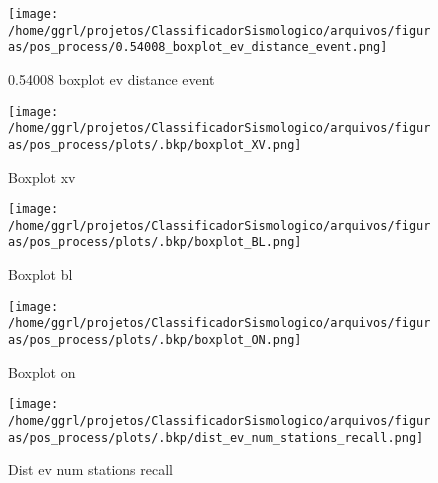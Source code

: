                     \begin{figure}[H]
                        \centering
                        \texttt{[image: /home/ggrl/projetos/ClassificadorSismologico/arquivos/figuras/pos\_process/0.54008\_boxplot\_ev\_distance\_event.png]}
                        \caption{0.54008 boxplot ev distance event}
                        \label{fig:0.54008_boxplot_ev_distance_event}
                    \end{figure}
                

                    \begin{figure}[H]
                        \centering
                        \texttt{[image: /home/ggrl/projetos/ClassificadorSismologico/arquivos/figuras/pos\_process/plots/.bkp/boxplot\_XV.png]}
                        \caption{Boxplot xv}
                        \label{fig:boxplot_XV}
                    \end{figure}
                

                    \begin{figure}[H]
                        \centering
                        \texttt{[image: /home/ggrl/projetos/ClassificadorSismologico/arquivos/figuras/pos\_process/plots/.bkp/boxplot\_BL.png]}
                        \caption{Boxplot bl}
                        \label{fig:boxplot_BL}
                    \end{figure}
                

                    \begin{figure}[H]
                        \centering
                        \texttt{[image: /home/ggrl/projetos/ClassificadorSismologico/arquivos/figuras/pos\_process/plots/.bkp/boxplot\_ON.png]}
                        \caption{Boxplot on}
                        \label{fig:boxplot_ON}
                    \end{figure}
                

                    \begin{figure}[H]
                        \centering
                        \texttt{[image: /home/ggrl/projetos/ClassificadorSismologico/arquivos/figuras/pos\_process/plots/.bkp/dist\_ev\_num\_stations\_recall.png]}
                        \caption{Dist ev num stations recall}
                        \label{fig:dist_ev_num_stations_recall}
                    \end{figure}
                

